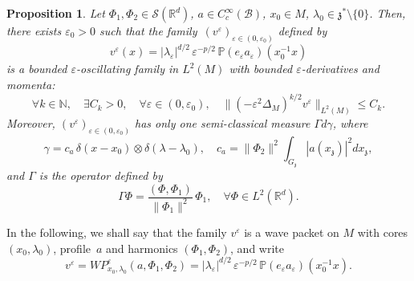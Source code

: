 \documentclass[10pt]{amsart}
\let\mathcal\mathscr
\theoremstyle{plain}
\newtheorem{proposition}[theorem]{Proposition}
\theoremstyle{definition}
\let\eps\varepsilon
\def\R{{\mathbb R}}
\def\N{{\mathbb N}}
\def\bbP{{\mathbb P}}
\begin{document}
\begin{proposition}\label{prop:WP}
Let $\Phi_1,\Phi_2\in \mathcal S(\R^d)$, $a\in C_c^\infty(\mathcal B)$,
$x_0\in M$, $\lambda_0\in\mathfrak z^*\setminus\{0\}$. Then, there exists $\eps_0>0$ such that the family~$(v^\eps)_{\eps\in(0,\eps_0)}$ defined by
\[
v^\eps (x)=|\lambda_\eps|^{d/2}\,\eps^{-p/2}
\, {\bbP} (e_\eps a_\eps)(x_0^{-1} x)
\]
is a bounded $\eps$-oscillating family in $L^2(M)$ with bounded $\eps$-derivatives and momenta:
\begin{equation}\label{eq:WPsobolev}
\forall k\in\N,\quad \exists C_k>0,\quad \forall \eps\in(0,\eps_0),\quad \| (-\eps^2\Delta_M)^{k/2} v^\eps\|_{L^2(M)}\leq C_k.
\end{equation}
Moreover, $(v^\eps)_{\eps\in(0,\eps_0)}$ has only one semi-classical measure $\Gamma d\gamma$, where
\begin{equation}\label{eq:WPmeasures}
\gamma=c_a\, \delta(x-x_0) \otimes \delta (\lambda-\lambda_0),\quad c_a= \|\Phi_2\|^2\int_{G_{\mathfrak z}} |a(x_{\mathfrak z})|^2 d x_{\mathfrak z},
\end{equation}
and $\Gamma$ is the operator
defined by
\[
\Gamma\Phi= \frac{(\Phi,\Phi_1)}{\|\Phi_1\|^2}\, \Phi_1,\quad \forall \Phi\in L^2(\R^d).
\]
\end{proposition}

In the following, we shall say that the family $v^\eps$ is a wave packet on $M$ with cores $(x_0,\lambda_0)$, profile~$a$ and harmonics $(\Phi_1,\Phi_2)$, and write
\[
v^\eps= WP^\eps_{x_0,\lambda_0}(a,\Phi_1,\Phi_2)=|\lambda_\eps|^{d/2}\,\eps^{-p/2}
\, {\bbP} (e_\eps a_\eps)(x_0^{-1}x).
\]
\end{document}
